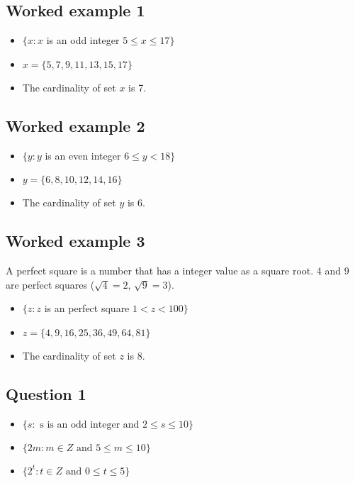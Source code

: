 \documentclass[12pt]{article}
\begin{document}
\subsection*{Worked example 1}
\begin{itemize}
\item $\{ x : x $ is an odd integer $ 5 \leq x \leq 17 \}$
\item $x = \{5,7,9,11,13,15,17\}$
\item The cardinality of set $x$ is 7.
\end{itemize}

\subsection*{Worked example 2}
\begin{itemize}
\item $\{ y : y $ is an even integer $ 6 \leq y < 18 \}$
\item $y = \{6,8,10,12,14,16\}$
\item The cardinality of set $y$ is 6.
\end{itemize}

\subsection*{Worked example 3}
A perfect square is a number that has a integer value as a
square root. 4 and 9 are perfect squares ($\sqrt{4} = 2$,
$\sqrt{9} = 3$).
\begin{itemize}
\item $\{ z : z $ is an perfect square $ 1 < z < 100 \}$
\item $z = \{4,9,16,25,36,49,64,81\}$
\item The cardinality of set $z$ is 8.
\end{itemize}



\subsection*{Question 1}

\begin{itemize}
\item $\{ s :  \mbox{ s is an odd integer and } 2 \leq s \leq 10 \}$
\item $\{ 2m :  m \in Z \mbox{ and }5 \leq m \leq 10 \}$
\item $\{ 2^t :  t \in Z \mbox{ and } 0 \leq t \leq 5 \}$
\end{itemize}
\end{document}
